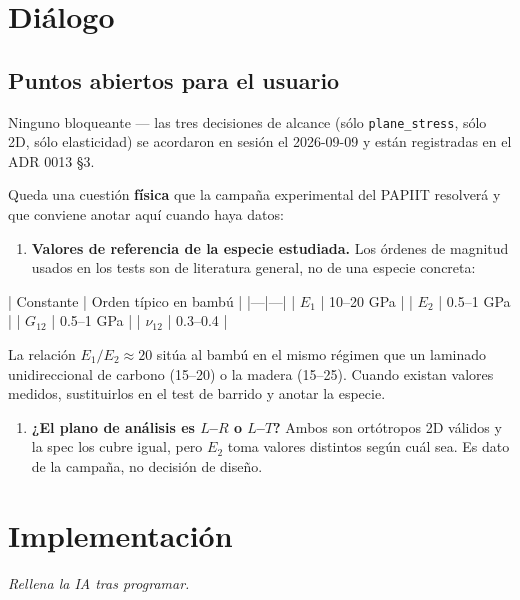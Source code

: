 \documentclass[11pt,letterpaper,oneside]{report}
\begin{document}
\section{Diálogo}

\subsection{Puntos abiertos para el usuario}

Ninguno bloqueante --- las tres decisiones de alcance (sólo \texttt{plane\_stress}, sólo 2D, sólo elasticidad) se acordaron en sesión el 2026-09-09 y están registradas en el ADR 0013 §3.

Queda una cuestión \textbf{física} que la campaña experimental del PAPIIT resolverá y que conviene anotar aquí cuando haya datos:

\begin{enumerate}
  \item \textbf{Valores de referencia de la especie estudiada.} Los órdenes de magnitud usados en los tests son de literatura general, no de una especie concreta:
\end{enumerate}

   | Constante | Orden típico en bambú |
   |---|---|
   | $E_1$ | 10--20 GPa |
   | $E_2$ | 0.5--1 GPa |
   | $G_{12}$ | 0.5--1 GPa |
   | $\nu_{12}$ | 0.3--0.4 |

   La relación $E_1/E_2 \approx 20$ sitúa al bambú en el mismo régimen que un laminado unidireccional de carbono (15--20) o la madera (15--25). Cuando existan valores medidos, sustituirlos en el test de barrido y anotar la especie.

\begin{enumerate}
  \item \textbf{¿El plano de análisis es $L$--$R$ o $L$--$T$?} Ambos son ortótropos 2D válidos y la spec los cubre igual, pero $E_2$ toma valores distintos según cuál sea. Es dato de la campaña, no decisión de diseño.
\end{enumerate}


\section{Implementación}

\textit{Rellena la IA tras programar.}
\end{document}
